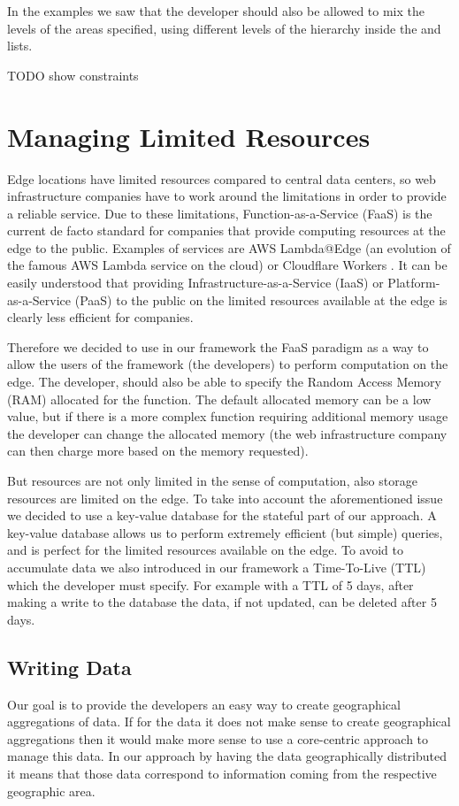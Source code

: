 In the examples we saw that the developer should also be allowed to mix the levels of the areas specified, using different levels of the hierarchy inside the  and  lists.

TODO show constraints


\section{Managing Limited Resources}
Edge locations have limited resources compared to central data centers, so web infrastructure companies have to work around the limitations in order to provide a reliable service.
Due to these limitations, Function-as-a-Service (FaaS) is the current de facto standard for companies that provide computing resources at the edge to the public. Examples of services are AWS Lambda@Edge (an evolution of the famous AWS Lambda service on the cloud) \cite{aws-lambda-at-edge} or Cloudflare Workers \cite{cloudflare-workers}. It can be easily understood that providing Infrastructure-as-a-Service (IaaS) or Platform-as-a-Service (PaaS) to the public on the limited resources available at the edge is clearly less efficient for companies.

Therefore we decided to use in our framework the FaaS paradigm as a way to allow the users of the framework (the developers) to perform computation on the edge. The developer, should also be able to specify the Random Access Memory (RAM) allocated for the function. The default allocated memory can be a low value, but if there is a more complex function requiring additional memory usage the developer can change the allocated memory (the web infrastructure company can then charge more based on the memory requested).

But resources are not only limited in the sense of computation, also storage resources are limited on the edge. To take into account the aforementioned issue we decided to use a key-value database for the stateful part of our approach. A key-value database allows us to perform extremely efficient (but simple) queries, and is perfect for the limited resources available on the edge. To avoid to accumulate data we also introduced in our framework a Time-To-Live (TTL) which the developer must specify. For example with a TTL of 5 days, after making a write to the database the data, if not updated, can be deleted after 5 days.


\subsection{Writing Data}
Our goal is to provide the developers an easy way to create geographical aggregations of data. If for the data it does not make sense to create geographical aggregations then it would make more sense to use a core-centric approach to manage this data. In our approach by having the data geographically distributed it means that those data correspond to information coming from the respective geographic area.

